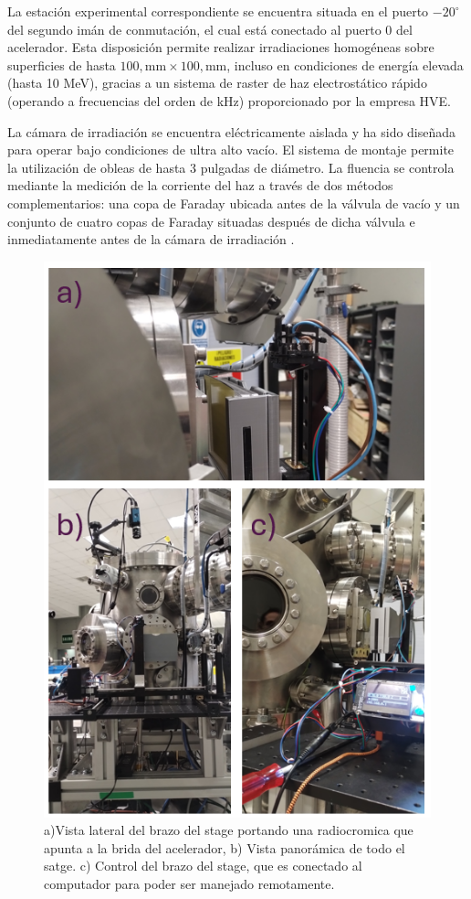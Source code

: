 \documentclass[onecolumn,12pt]{article} %
\begin{document}
La estación experimental correspondiente se encuentra situada en el puerto $-20^\circ$ del segundo imán de conmutación, el cual está conectado al puerto 0 del acelerador. Esta disposición permite realizar irradiaciones homogéneas sobre superficies de hasta $100,\text{mm} \times 100,\text{mm}$, incluso en condiciones de energía elevada (hasta 10 MeV), gracias a un sistema de raster de haz electrostático rápido (operando a frecuencias del orden de kHz) proporcionado por la empresa HVE.

La cámara de irradiación se encuentra eléctricamente aislada y ha sido diseñada para operar bajo condiciones de ultra alto vacío. El sistema de montaje permite la utilización de obleas de hasta 3 pulgadas de diámetro. La fluencia se controla mediante la medición de la corriente del haz a través de dos métodos complementarios: una copa de Faraday ubicada antes de la válvula de vacío y un conjunto de cuatro copas de Faraday situadas después de dicha válvula e inmediatamente antes de la cámara de irradiación \cite{cmam_uam_2023}.



\begin{figure}[H]
    \centering
    \includegraphics[width=0.5\linewidth]{img_exp/stage.png}
    \caption{a)Vista lateral del brazo del stage portando una radiocromica que apunta a la brida del acelerador, b) Vista panorámica de todo el satge. c) Control del brazo del stage, que es conectado al computador para poder ser manejado remotamente. }
    \label{fig:enter-label}
\end{figure}
\end{document}
